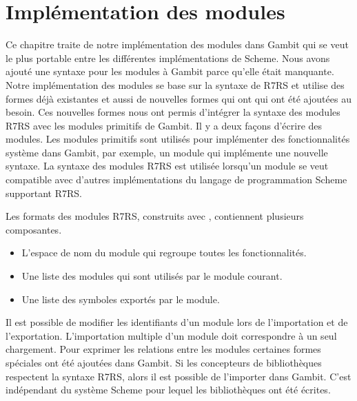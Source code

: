 
\chapter{Implémentation des modules}
\label{ch:modules_implementation}
Ce chapitre traite de notre implémentation des modules dans Gambit qui se veut
le plus portable entre les différentes implémentations de Scheme.  Nous avons
ajouté une syntaxe pour les modules à Gambit parce qu'elle était manquante.
Notre implémentation des modules se base sur la syntaxe de R7RS et utilise des
formes déjà existantes et aussi de nouvelles formes qui ont qui ont été
ajoutées au besoin.  Ces nouvelles formes nous ont permis d'intégrer la syntaxe
des modules R7RS avec les modules primitifs de Gambit. Il y a deux façons
d'écrire des modules.  Les modules primitifs sont utilisés pour implémenter des
fonctionnalités système dans Gambit, par exemple, un module qui implémente une
nouvelle syntaxe.  La syntaxe des modules R7RS est utilisée lorsqu'un module se
veut compatible avec d'autres implémentations du langage de programmation
Scheme supportant R7RS.

Les formats des modules R7RS, construits avec , contiennent
plusieurs composantes.
\begin{itemize}
  \item L'espace de nom du module qui regroupe toutes les fonctionnalités.
  \item Une liste des modules qui sont utilisés par le module courant.
  \item Une liste des symboles exportés par le module.
\end{itemize}
Il est possible de modifier les identifiants d'un module lors de l'importation et de l'exportation.
L'importation multiple d'un module doit correspondre à un seul chargement.
Pour exprimer les relations entre les modules certaines formes spéciales
ont été ajoutées dans Gambit.  Si les concepteurs de bibliothèques respectent
la syntaxe R7RS, alors il est possible de l'importer dans Gambit. C'est indépendant
du système Scheme pour lequel les bibliothèques ont été écrites.





